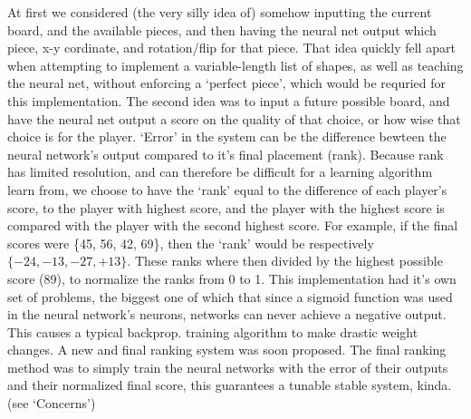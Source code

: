 \documentclass{report}
\begin{document}
	At first we considered (the very silly idea of) somehow inputting the current board, and the available pieces, and then having the neural net output which piece, x-y cordinate,
	and rotation/flip for that piece. That idea quickly fell apart when attempting to implement a variable-length list of shapes, as well as teaching the neural net, without enforcing a `perfect
	piece', which would be requried for this implementation.
	The second idea was to input a future possible board, and have the neural net output a score on the quality of that choice, or how wise that choice is for the player.
	`Error' in the system can be the difference bewteen the neural network's output compared to it's final placement (rank). Because rank has limited resolution, and can therefore be difficult
	for a learning algorithm learn from, we choose to have the `rank' equal to the difference of each player's score, to the player with highest score, and the player with the highest score is
	compared with the player with the second highest score. For example, if the final scores were \{45, 56, 42, 69\}, then the `rank' would be respectively $\{-24, -13, -27,+13\}$. These ranks
	where then divided by the highest possible score (89), to normalize the ranks from 0 to 1. This implementation had it's own set of problems, the biggest one of which that since a sigmoid
	function was used in the neural network's neurons, networks can never achieve a negative output. This causes a typical backprop. training algorithm to make drastic weight changes. A new and
	final ranking system was soon proposed. The final ranking method was to simply train the neural networks with the error of their outputs and their normalized final score, this guarantees
	a tunable stable system, kinda. (see `Concerns')
\end{document}
